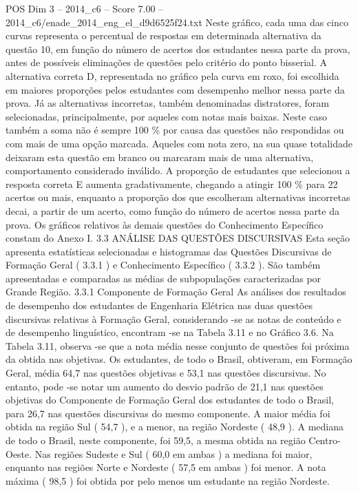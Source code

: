 \begin{textsample}{POS Dim 3 – 2014\_c6 – Score 7.00 – 2014\_c6/enade\_2014\_eng\_el\_d9d6525f24.txt}
Neste gráfico, cada uma das cinco curvas representa o percentual de respostas em determinada alternativa da questão 10, em função do número de acertos dos estudantes nessa parte da prova, antes de possíveis eliminações de questões pelo critério do ponto bisserial.
A alternativa correta D, representada no gráfico pela curva em roxo, foi escolhida em maiores proporções pelos estudantes com desempenho melhor nessa parte da prova.
Já as alternativas incorretas, também denominadas distratores, foram selecionadas, principalmente, por aqueles com notas mais baixas.
Neste caso também a soma não é sempre 100 \% por causa das questões não respondidas ou com mais de uma opção marcada.
Aqueles com nota zero, na sua quase totalidade deixaram esta questão em branco ou marcaram mais de uma alternativa, comportamento considerado inválido.
A proporção de estudantes que selecionou a resposta correta E aumenta gradativamente, chegando a atingir 100 \% para 22 acertos ou mais, enquanto a proporção dos que escolheram alternativas incorretas decai, a partir de um acerto, como função do número de acertos nessa parte da prova.
Os gráficos relativos às demais questões do Conhecimento Específico constam do Anexo I. 3.3 ANÁLISE DAS QUESTÕES DISCURSIVAS Esta seção apresenta estatísticas selecionadas e histogramas das Questões Discursivas de Formação Geral ( 3.3.1 ) e Conhecimento Específico ( 3.3.2 ).
São também apresentadas e comparadas as médias de subpopulações caracterizadas por Grande Região. 3.3.1 Componente de Formação Geral As análises dos resultados de desempenho dos estudantes de Engenharia Elétrica nas duas questões discursivas relativas à Formação Geral, considerando -se as notas de conteúdo e de desempenho linguístico, encontram -se na Tabela 3.11 e no Gráfico 3.6.
Na Tabela 3.11, observa -se que a nota média nesse conjunto de questões foi próxima da obtida nas objetivas.
Os estudantes, de todo o Brasil, obtiveram, em Formação Geral, média 64,7 nas questões objetivas e 53,1 nas questões discursivas.
No entanto, pode -se notar um aumento do desvio padrão de 21,1 nas questões objetivas do Componente de Formação Geral dos estudantes de todo o Brasil, para 26,7 nas questões discursivas do mesmo componente.
A maior média foi obtida na região Sul ( 54,7 ), e a menor, na região Nordeste ( 48,9 ).
A mediana de todo o Brasil, neste componente, foi 59,5, a mesma obtida na região Centro-Oeste.
Nas regiões Sudeste e Sul ( 60,0 em ambas ) a mediana foi maior, enquanto nas regiões Norte e Nordeste ( 57,5 em ambas ) foi menor.
A nota máxima ( 98,5 ) foi obtida por pelo menos um estudante na região Nordeste.

\end{textsample}
